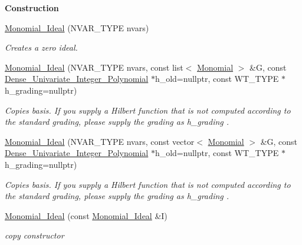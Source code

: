 \begin{Indent}\textbf{ Construction}\par
\begin{DoxyCompactItemize}
\item 
\mbox{\label{group__polygroup_a1c1ca0ff8991217e18bb263c7ecfc316}} 
\hyperlink{group__polygroup_a1c1ca0ff8991217e18bb263c7ecfc316}{Monomial\+\_\+\+Ideal} (N\+V\+A\+R\+\_\+\+T\+Y\+PE nvars)
\begin{DoxyCompactList}\small\item\em Creates a zero ideal. \end{DoxyCompactList}\item 
\mbox{\label{group__polygroup_a7db4fc98fce195b0d0ba5fa9c89292a0}} 
\hyperlink{group__polygroup_a7db4fc98fce195b0d0ba5fa9c89292a0}{Monomial\+\_\+\+Ideal} (N\+V\+A\+R\+\_\+\+T\+Y\+PE nvars, const list$<$ \hyperlink{group__polygroup_class_monomial}{Monomial} $>$ \&G, const \hyperlink{group__polygroup_class_dense___univariate___integer___polynomial}{Dense\+\_\+\+Univariate\+\_\+\+Integer\+\_\+\+Polynomial} $\ast$h\+\_\+old=nullptr, const W\+T\+\_\+\+T\+Y\+PE $\ast$h\+\_\+grading=nullptr)
\begin{DoxyCompactList}\small\item\em Copies {\ttfamily basis}. If you supply a Hilbert function that is not computed according to the standard grading, please supply the grading as {\ttfamily h\+\_\+grading} . \end{DoxyCompactList}\item 
\mbox{\label{group__polygroup_af10301d05f7eac529acca28831e54eac}} 
\hyperlink{group__polygroup_af10301d05f7eac529acca28831e54eac}{Monomial\+\_\+\+Ideal} (N\+V\+A\+R\+\_\+\+T\+Y\+PE nvars, const vector$<$ \hyperlink{group__polygroup_class_monomial}{Monomial} $>$ \&G, const \hyperlink{group__polygroup_class_dense___univariate___integer___polynomial}{Dense\+\_\+\+Univariate\+\_\+\+Integer\+\_\+\+Polynomial} $\ast$h\+\_\+old=nullptr, const W\+T\+\_\+\+T\+Y\+PE $\ast$h\+\_\+grading=nullptr)
\begin{DoxyCompactList}\small\item\em Copies {\ttfamily basis}. If you supply a Hilbert function that is not computed according to the standard grading, please supply the grading as {\ttfamily h\+\_\+grading} . \end{DoxyCompactList}\item 
\mbox{\label{group__polygroup_aa20312c8d7f14a18d73128a99d1d5c04}} 
\hyperlink{group__polygroup_aa20312c8d7f14a18d73128a99d1d5c04}{Monomial\+\_\+\+Ideal} (const \hyperlink{group__polygroup_class_monomial___ideal}{Monomial\+\_\+\+Ideal} \&I)
\begin{DoxyCompactList}\small\item\em copy constructor \end{DoxyCompactList}\end{DoxyCompactItemize}
\end{Indent}
